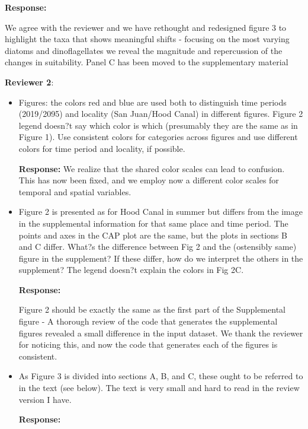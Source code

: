\documentclass[11pt]{article}
\begin{document}
\begin{linenumbers}
\begin{itemize}
\textbf{Response:}

We agree with the reviewer and we have rethought and redesigned figure 3 to highlight the taxa that shows meaningful shifts - focusing on the most varying diatoms and dinoflagellates we reveal the magnitude and repercussion of the changes in suitability. Panel C has been moved to the supplementary material


\end{itemize}

\vspace*{1em}
\textbf{\large{ Reviewer 2}}: 

\begin{itemize}
\item{Figures: the colors red and blue are used both to distinguish time periods (2019/2095) and locality (San Juan/Hood Canal) in different figures. Figure 2 legend doesn?t say which color is which (presumably they are the same as in Figure 1). Use consistent colors for categories across figures and use different colors for time period and locality, if possible.}

\textbf{Response:}
    We realize that the shared color scales can lead to confusion. This has now been fixed, and we employ now a different color scales for temporal and spatial variables.  
    
\item{Figure 2 is presented as for Hood Canal in summer but differs from the image in the supplemental information for that same place and time period. The points and axes in the CAP plot are the same, but the plots in sections B and C differ. What?s the difference between Fig 2 and the (ostensibly same) figure in the supplement? If these differ, how do we interpret the others in the supplement? The legend doesn?t explain the colors in Fig 2C.} 

\textbf{Response:}

Figure 2 should be exactly the same as the first part of the Supplemental figure - A thorough review of the code that generates the supplemental figures revealed a small difference in the input dataset. We thank the reviewer for noticing this, and now the code that generates each of the figures is consistent.

\item{As Figure 3 is divided into sections A, B, and C, these ought to be referred to in the text (see below). The text is very small and hard to read in the review version I have.}

\textbf{Response:}


\end{itemize}
\end{linenumbers}
\end{document}
